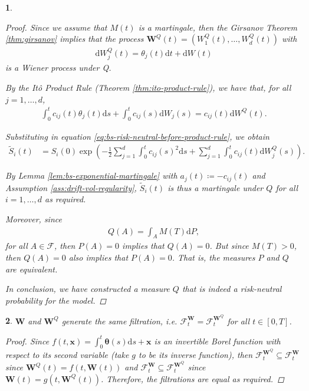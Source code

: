 \documentclass[english]{article}
\numberwithin{equation}{section}
\numberwithin{figure}{section}
\theoremstyle{bolddescit}
\newtheorem{theorem}{\protect\theoremname}[section]
\theoremstyle{definition}
\theoremstyle{definition}
\theoremstyle{plain}
\theoremstyle{plain}
\theoremstyle{bolddesc}
\theoremstyle{plain}
\theoremstyle{remark}
\providecommand{\theoremname}{Theorem}
\begin{document}
\begin{theorem}
\begin{proof}
    Since we assume that $M(t)$ is a martingale, then the Girsanov Theorem \ref{thm:girsanov} implies that the process $\mathbf{W}^Q(t) = (W^Q_1(t), \ldots, W^Q_d(t))$ with
    \begin{align*}
      \mathrm{d}W^Q_j(t) = \theta_j(t) \mathrm{d}t + \mathrm{d}W(t)
    \end{align*}
    is a Wiener process under Q.

    By the It\^o Product Rule (Theorem \ref{thm:ito-product-rule}), we have that, for all $j=1,\ldots,d$,
    \begin{align*}
      \int_0^t c_{ij}(t) \theta_j(t) \mathrm{d}s + \int_0^t c_{ij}(s) \mathrm{d}W_j(s)
      = c_{ij}(t) \mathrm{d}W^Q(t).
    \end{align*}

    Substituting in equation \eqref{eq:bs-risk-neutral-before-product-rule}, we obtain
    \begin{align}\label{eq:bs-discounted-stock-price}
      \widetilde{S}_i(t)
      &= S_i(0) \exp \left( - \frac{1}{2} \sum_{j=1}^{d} \int_0^t c_{ij}(s)^2 \mathrm{d}s
      + \sum_{j=1}^d \int_0^t c_{ij}(t) \mathrm{d}W^Q_j(s)\right).
    \end{align}

    By Lemma \ref{lem:bs-exponential-martingale} with $a_j(t) \coloneq - c_{ij}(t)$ and Assumption \ref{ass:drift-vol-regularity}, $\widetilde{S}_i(t)$ is thus a martingale under $Q$ for all $i=1,\ldots,d$ as required.

    Moreover, since
    \begin{align*}
      Q(A) = \int_A M(T) \mathrm{d}P,
    \end{align*}
    for all $A \in \mathcal{F}$, then $P(A) = 0$ implies that $Q(A) = 0$. But since $M(T) > 0$, then $Q(A) = 0$ also implies that $P(A) = 0$. That is, the measures $P$ and $Q$ are equivalent.

    In conclusion, we have constructed a measure $Q$ that is indeed a risk-neutral probability for the model.
  \end{proof}
\end{theorem}

\begin{theorem}
  $\mathbf{W}$ and $\mathbf{W}^Q$ generate the same filtration, i.e. $\mathcal{F}^\mathbf{W}_t = \mathcal{F}^{\mathbf{W}^Q}_t$ for all $t \in [0,T]$.

  \begin{proof}
    Since $f(t, \mathbf{x}) = \int_0^t \mathbf{\theta}(s) \mathrm{d}s + \mathbf{x}$ is an invertible Borel function with respect to its second variable (take $g$ to be its inverse function), then $\mathcal{F}^{\mathbf{W}^Q}_t \subseteq \mathcal{F}^{\mathbf{W}}_t$ since $\mathbf{W}^Q(t) = f(t,\mathbf{W}(t))$ and $\mathcal{F}^{\mathbf{W}}_t \subseteq \mathcal{F}^{\mathbf{W}^Q}_t$ since $\mathbf{W}(t) = g(t,\mathbf{W}^Q(t))$. Therefore, the filtrations are equal as required.
  \end{proof}
\end{theorem}
\end{document}
